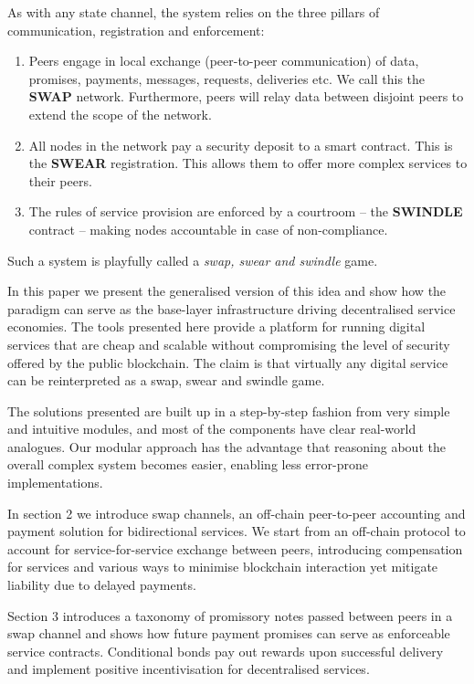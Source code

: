 As with any state channel, the system relies on the three pillars of communication, registration and enforcement:
\begin{enumerate}
 \item Peers engage in local exchange (peer-to-peer communication) of data, promises, payments, messages, requests, deliveries etc. We call this the \textbf{SWAP} network. Furthermore, peers will relay data between disjoint peers to extend the scope of the network.
 \item All nodes in the network pay a security deposit to a smart contract. This is the \textbf{SWEAR} registration. This allows them to offer more complex services to their peers.
 \item The rules of service provision are enforced by a courtroom -- the \textbf{SWINDLE} contract -- making nodes accountable in case of non-compliance.
\end{enumerate}

Such a system is playfully called a \emph{swap, swear and swindle} game.

In this paper we present the generalised version of this idea and show how the paradigm can serve as the base-layer infrastructure driving decentralised service economies.
The tools presented here provide a platform for running digital services that are cheap and scalable without compromising the level of security offered by the public blockchain.
The claim is that virtually any digital service can be reinterpreted as a swap, swear and swindle game.

The solutions presented are built up in a step-by-step fashion from very simple and intuitive
modules, %
and most of the components have clear real-world analogues. Our modular approach has the advantage that reasoning about the overall complex system becomes easier, enabling less error-prone implementations.

In section 2 we introduce swap channels, an off-chain peer-to-peer accounting and
payment solution for bidirectional services. We start from an off-chain protocol to
account for service-for-service exchange between peers, introducing compensation for services
and various ways to minimise blockchain interaction yet mitigate liability due to delayed payments.

Section 3 introduces a taxonomy of promissory notes passed between peers in a swap channel and shows how future payment promises can serve as enforceable service contracts.
Conditional bonds pay out rewards upon successful delivery and
implement positive incentivisation for decentralised services.

